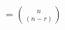 \documentclass[preview]{standalone}
\begin{document}
\begin{center}
$= \binom{n}{(n-r)}$
\end{center}
\end{document}
